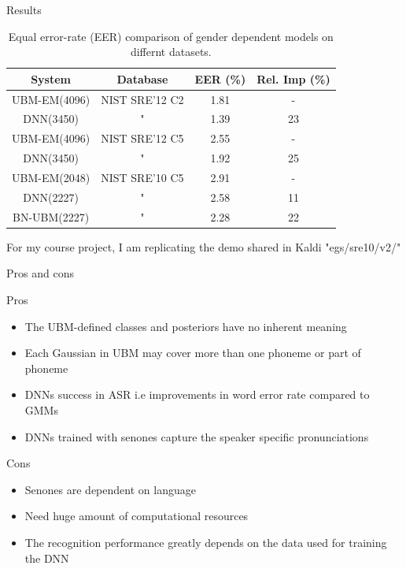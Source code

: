\documentclass{beamer}
\begin{document}
\begin{frame}{Results}
\begin{table}[]
    \centering
    \begin{tabular}{|c|c|c|c|}
      \hline
       \textbf{System}  & \textbf{Database} & \textbf{EER (\%)} & \textbf{Rel. Imp (\%)} \\ \hline
        UBM-EM(4096) & NIST SRE'12 C2 & 1.81 & - \alert{\cite{Yun_Lei2014}} \\
        DNN(3450)    & "              & 1.39 & 23  \\ \hline
        UBM-EM(4096) & NIST SRE'12 C5 & 2.55 & - \alert{\cite{Yun_Lei2014}}\\ 
        DNN(3450)    & "              & 1.92 & 25\\ \hline
        UBM-EM(2048) & NIST SRE'10 C5 & 2.91 & - \alert{\cite{Yao2015}}\\
        DNN(2227)    & "              & 2.58 & 11  \\
        BN-UBM(2227) &  "             & 2.28 & 22  \\ \hline
    \end{tabular}
    \caption{Equal error-rate (EER) comparison of gender dependent models on differnt datasets.}
    \label{tab:my_label}
For my course project, I am replicating the demo shared in Kaldi "egs/sre10/v2/"
\end{table}
  
\end{frame}

\begin{frame} {Pros and cons}
\begin{block}{Pros}
\begin{itemize}
    \item The UBM-defined classes and posteriors have no inherent meaning
    \item Each Gaussian in UBM may cover more than one phoneme or part of phoneme
    \item DNNs success in ASR i.e improvements in word error rate compared to GMMs
    \item DNNs trained with senones capture the speaker specific pronunciations
\end{itemize}
\end{block}
\begin{block}{Cons}
\begin{itemize}
    \item Senones are dependent on language
    \item Need huge amount of computational resources
    \item The recognition performance greatly depends on the data used for training the DNN
\end{itemize}
\end{block}
\end{frame}
\end{document}
